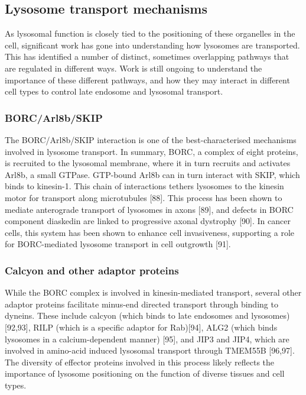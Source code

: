 \documentclass[
  12pt,
  a4paper,
]{book}
\begin{document}
\hypertarget{lysosome-transport-mechanisms}{%
\subsection{Lysosome transport mechanisms}\label{lysosome-transport-mechanisms}}

As lysosomal function is closely tied to the positioning of these organelles in the cell, significant work has gone into understanding how lysosomes are transported. This has identified a number of distinct, sometimes overlapping pathways that are regulated in different ways. Work is still ongoing to understand the importance of these different pathways, and how they may interact in different cell types to control late endosome and lysosomal transport.

\hypertarget{borcarl8bskip}{%
\subsubsection{BORC/Arl8b/SKIP}\label{borcarl8bskip}}

The BORC/Arl8b/SKIP interaction is one of the best-characterised mechanisms involved in lysosome transport. In summary, BORC, a complex of eight proteins, is recruited to the lysosomal membrane, where it in turn recruits and activates Arl8b, a small GTPase. GTP-bound Arl8b can in turn interact with SKIP, which binds to kinesin-1. This chain of interactions tethers lysosomes to the kinesin motor for transport along microtubules {[}88{]}. This process has been shown to mediate anterograde transport of lysosomes in axons {[}89{]}, and defects in BORC component diaskedin are linked to progressive axonal dystrophy {[}90{]}. In cancer cells, this system has been shown to enhance cell invasiveness, supporting a role for BORC-mediated lysosome transport in cell outgrowth {[}91{]}.

\hypertarget{calcyon-and-other-adaptor-proteins}{%
\subsubsection{Calcyon and other adaptor proteins}\label{calcyon-and-other-adaptor-proteins}}

While the BORC complex is involved in kinesin-mediated transport, several other adaptor proteins facilitate minus-end directed transport through binding to dyneins. These include calcyon (which binds to late endosomes and lysosomes) {[}92,93{]}, RILP (which is a specific adaptor for Rab){[}94{]}, ALG2 (which binds lysosomes in a calcium-dependent manner) {[}95{]}, and JIP3 and JIP4, which are involved in amino-acid induced lysosomal transport through TMEM55B {[}96,97{]}. The diversity of effector proteins involved in this process likely reflects the importance of lysosome positioning on the function of diverse tissues and cell types.
\end{document}
